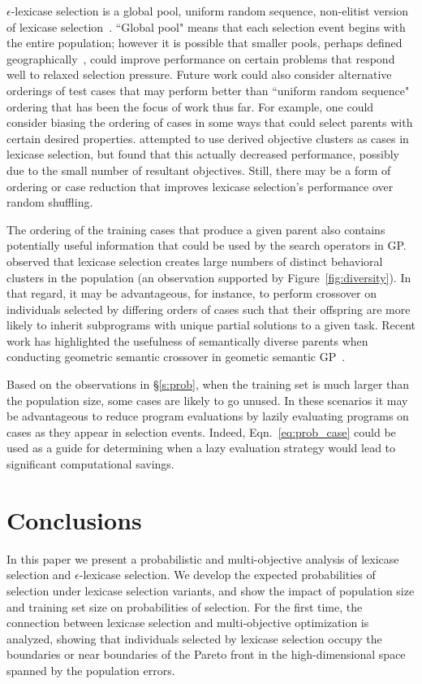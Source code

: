 \documentclass[twoside]{article}
\begin{document}
$\epsilon$-lexicase selection is a global pool, uniform random sequence, non-elitist version of lexicase selection~\citep{spector_assessment_2012}. ``Global pool" means that each selection event begins with the entire population; however it is possible that smaller pools, perhaps defined geographically~\citep{spector_trivial_2006}, could improve performance on certain problems that respond well to relaxed selection pressure. Future work could also consider alternative orderings of test cases that may perform better than ``uniform random sequence" ordering that has been the focus of work thus far. For example, one could consider biasing the ordering of cases in some ways that could select parents with certain desired properties. \cite{liskowski_comparison_2015} attempted to use derived objective clusters as cases in lexicase selection, but found that this actually decreased performance, possibly due to the small number of resultant objectives. Still, there may be a form of ordering or case reduction that improves lexicase selection's performance over random shuffling.   
 
The ordering of the training cases that produce a given parent also contains potentially useful information that could be used by the search operators in GP. \cite{helmuth_general_2015-1} observed that lexicase selection creates large numbers of distinct behavioral clusters in the population (an observation supported by Figure~\ref{fig:diversity}). In that regard, it may be advantageous, for instance, to perform crossover on individuals selected by differing orders of cases such that their offspring are more likely to inherit subprograms with unique partial solutions to a given task. Recent work has highlighted the usefulness of semantically diverse parents when conducting geometric semantic crossover in geometic semantic GP~\citep{Chen2017}.   

Based on the observations in \S\ref{s:prob}, when the training set is much larger than the population size, some cases are likely to go unused. In these scenarios it may be advantageous to reduce program evaluations by lazily evaluating programs on cases as they appear in selection events. Indeed, Eqn.~\ref{eq:prob_case} could be used as a guide for determining when a lazy evaluation strategy would lead to significant computational savings.

\section{Conclusions}\label{s:conclusion}
In this paper we present a probabilistic and multi-objective analysis of lexicase selection and $\epsilon$-lexicase selection. We develop the expected probabilities of selection under lexicase selection variants, and show the impact of population size and training set size on probabilities of selection. For the first time, the connection between lexicase selection and multi-objective optimization is analyzed, showing that individuals selected by lexicase selection occupy the boundaries or near boundaries of the Pareto front in the high-dimensional space spanned by the population errors. 
\end{document}
